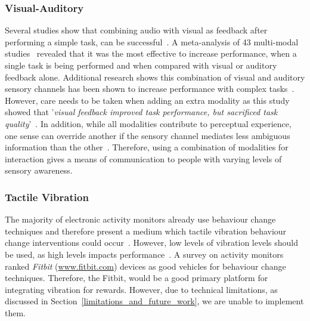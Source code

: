 \subsubsection{Visual-Auditory}
Several studies show that combining audio with visual as feedback after performing a simple task, can be successful~\cite{benefits_of_audio_visual_1, benefits_of_audio_visual_2}. A meta-analysis of 43 multi-modal studies~\cite{comparing_modalities_effects_of_visual_auditory} revealed that it was the most effective to increase performance, when a single task is being performed and when compared with visual or auditory feedback alone. Additional research shows this combination of visual and auditory sensory channels has been shown to increase performance with complex tasks~\cite{chi_oussama_tap_the_shapetones}. However, care needs to be taken when adding an extra modality as this study showed that '\textit{visual feedback improved task performance, but sacrificed task quality}'~\cite{comparing_modalities_effects_of_visual_auditory}. In addition, while all modalities contribute to perceptual experience, one sense can override another if the sensory channel mediates less ambiguous information than the other~\cite{one_mode_override_another}. Therefore, using a combination of modalities for interaction gives a means of communication to people with varying levels of sensory awareness.

\subsubsection{Tactile Vibration}
The majority of electronic activity monitors already use behaviour change techniques and therefore present a medium which tactile vibration behaviour change interventions could occur~\cite{benefits_of_audio_visual_1, article_designing_for_health_behaviour_change_hci}. However, low levels of vibration levels should be used, as high levels impacts performance~\cite{high_audio_feedback_negative_performance}. A survey on activity monitors~\cite{article_wearable_good} ranked \textit{Fitbit} (\url{www.fitbit.com}) devices as good vehicles for behaviour change techniques. Therefore, the Fitbit, would be a good primary platform for integrating vibration for rewards. However, due to technical limitations, as discussed in Section~\ref{limitations_and_future_work}, we are unable to implement them.


